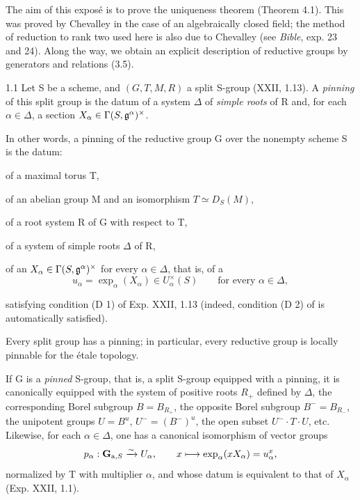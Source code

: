 \label{XXIII}
\setcounter{footnote}{-1}
The aim of this exposé is to prove the uniqueness theorem (Theorem 4.1). This was proved by Chevalley in the case of an algebraically closed field; the method of reduction to rank two used here is also due to Chevalley (see \textit{Bible}, exp. 23 and 24). Along the way, we obtain an explicit description of reductive groups by generators and relations (3.5).

\begin{definition}{1.1}\label{XXIII.1.1}
Let S be a scheme, and $(G,T,M,R)$ a split S-group (XXII, 1.13). A \emph{pinning} of this split group is the datum of a system $\Delta$ of \emph{simple roots} of R and, for each $\alpha\in\Delta$, a section $X_\alpha\in\Gamma(S,\mathfrak g^\alpha)^\times$.

In other words, a pinning of the reductive group G over the nonempty scheme S is the datum:
\begin{enumeratei}
\item of a maximal torus T,
\item of an abelian group M and an isomorphism $T\simeq D_S(M)$,
\item of a root system R of G with respect to T,
\item of a system of simple roots $\Delta$ of R,
\item of an $X_\alpha\in\Gamma(S,\mathfrak g^\alpha)^\times$ for every $\alpha\in\Delta$, that is, of a
\[
u_\alpha=\exp_\alpha(X_\alpha)\in U_\alpha^\times(S)\qquad\text{for every }\alpha\in\Delta,
\]
\end{enumeratei}
satisfying condition (D 1) of Exp. XXII, 1.13 (indeed, condition (D 2) of \loccit is automatically satisfied).
\end{definition}

Every split group has a pinning; in particular, every reductive group is locally pinnable for the étale topology.

If G is a \emph{pinned} S-group, that is, a split S-group equipped with a pinning, it is canonically equipped with the system of positive roots $R_+$ defined by $\Delta$, the corresponding Borel subgroup $B=B_{R_+}$, the opposite Borel subgroup $B^-=B_{R_-}$, the unipotent groups $U=B^u$, $U^-=(B^-)^u$, the open subset $U^-\cdot T\cdot U$, etc. Likewise, for each $\alpha\in\Delta$, one has a canonical isomorphism of vector groups
\[
p_\alpha:\mathbf G_{\mathrm a,S}\xrightarrow{\sim} U_\alpha,\qquad x\longmapsto\exp_\alpha(xX_\alpha)=u_\alpha^x,
\]
normalized by T with multiplier $\alpha$, and whose datum is equivalent to that of $X_\alpha$ (Exp. XXII, 1.1).

